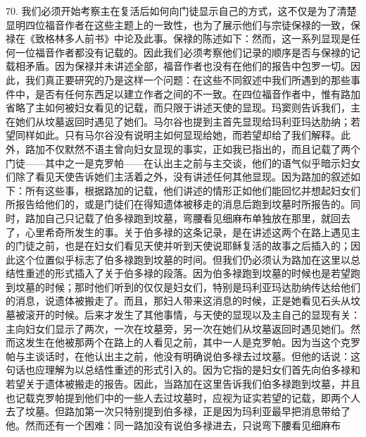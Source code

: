 70. 我们必须开始考察主在复活后如何向门徒显示自己的方式，这不仅是为了清楚显明四位福音作者在这些主题上的一致性，也为了展示他们与宗徒保禄的一致，保禄在《致格林多人前书》中论及此事。保禄的陈述如下：然而，这一系列显现是任何一位福音作者都没有记载的。因此我们必须考察他们记录的顺序是否与保禄的记载相矛盾。因为保禄并未讲述全部，福音作者也没有在他们的报告中包罗一切。因此，我们真正要研究的乃是这样一个问题：在这些不同叙述中我们所遇到的那些事件中，是否有任何东西足以建立作者之间的不一致。在四位福音作者中，惟有路加省略了主如何被妇女看见的记载，而只限于讲述天使的显现。玛窦则告诉我们，主在她们从坟墓返回时遇见了她们。马尔谷也提到主首先显现给玛利亚玛达肋纳；若望同样如此。只有马尔谷没有说明主如何显现给她，而若望却给了我们解释。此外，路加不仅默然不语主曾向妇女显现的事实，正如我已指出的，而且记载了两个门徒——其中之一是克罗帕——在认出主之前与主交谈，他们的语气似乎暗示妇女们除了看见天使告诉她们主活着之外，没有讲述任何其他显现。因为路加的叙述如下：所有这些事，根据路加的记载，他们讲述的情形正如他们能回忆并想起妇女们所报告给他们的，或是门徒们在得知遗体被移走的消息后跑到坟墓时所报告的。同时，路加自己只记载了伯多禄跑到坟墓，弯腰看见细麻布单独放在那里，就回去了，心里希奇所发生的事。关于伯多禄的这条记录，是在讲述这两个在路上遇见主的门徒之前，也是在妇女们看见天使并听到天使说耶稣复活的故事之后插入的；因此这个位置似乎标志了伯多禄跑到坟墓的时间。但我们仍必须认为路加在这里以总结性重述的形式插入了关于伯多禄的段落。因为伯多禄跑到坟墓的时候也是若望跑到坟墓的时候；那时他们听到的仅仅是妇女们，特别是玛利亚玛达肋纳传达给他们的消息，说遗体被搬走了。而且，那妇人带来这消息的时候，正是她看见石头从坟墓被滚开的时候。后来才发生了其他事情，与天使的显现以及主自己的显现有关：主向妇女们显示了两次，一次在坟墓旁，另一次在她们从坟墓返回时遇见她们。然而这发生在他被那两个在路上的人看见之前，其中一人是克罗帕。因为当这个克罗帕与主谈话时，在他认出主之前，他没有明确说伯多禄去过坟墓。但他的话说：这句话也应理解为以总结性重述的形式引入的。因为它指的是妇女们首先向伯多禄和若望关于遗体被搬走的报告。因此，当路加在这里告诉我们伯多禄跑到坟墓，并且也记载克罗帕提到他们中的一些人去过坟墓时，应视为证实若望的记载，即两个人去了坟墓。但路加第一次只特别提到伯多禄，正是因为玛利亚最早把消息带给了他。然而还有一个困难：同一路加没有说伯多禄进去，只说弯下腰看见细麻布